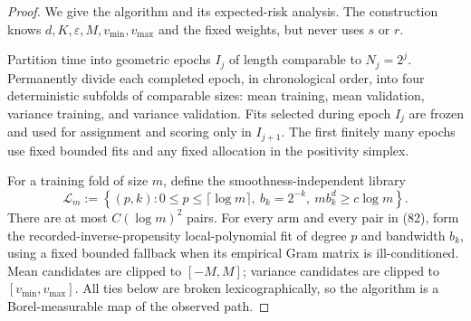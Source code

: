 \documentclass{article}
\begin{document}
\begin{proof}
We give the algorithm and its expected-risk analysis. The construction knows \(d,K,\varepsilon,M,v_{\min},v_{\max}\) and the fixed weights, but never uses \(s\) or \(r\).

Partition time into geometric epochs \(I_j\) of length comparable to \(N_j=2^j\). Permanently divide each completed epoch, in chronological order, into four deterministic subfolds of comparable sizes: mean training, mean validation, variance training, and variance validation. Fits selected during epoch \(I_j\) are frozen and used for assignment and scoring only in \(I_{j+1}\). The first finitely many epochs use fixed bounded fits and any fixed allocation in the positivity simplex.

For a training fold of size \(m\), define the smoothness-independent library
\[
\mathcal L_m:=
\left\{(p,k):0\leq p\leq\lceil\log m\rceil,
\ b_k=2^{-k},\ mb_k^d\geq c\log m\right\}.
\tag{82}
\]
There are at most \(C(\log m)^2\) pairs. For every arm and every pair in (82), form the recorded-inverse-propensity local-polynomial fit of degree \(p\) and bandwidth \(b_k\), using a fixed bounded fallback when its empirical Gram matrix is ill-conditioned. Mean candidates are clipped to \([-M,M]\); variance candidates are clipped to \([v_{\min},v_{\max}]\). All ties below are broken lexicographically, so the algorithm is a Borel-measurable map of the observed path.


\end{proof}
\end{document}
